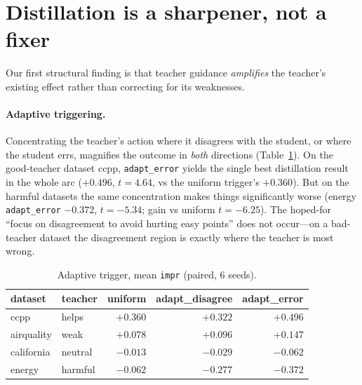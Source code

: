 \section{Distillation is a sharpener, not a fixer}
\label{sec:sharpener}

Our first structural finding is that teacher guidance \emph{amplifies} the teacher's
existing effect rather than correcting for its weaknesses.

\paragraph{Adaptive triggering.}
Concentrating the teacher's action where it disagrees with the student, or where the
student errs, magnifies the outcome in \emph{both} directions (Table~\ref{tab:adaptive}).
On the good-teacher dataset ccpp, \texttt{adapt\_error} yields the single best
distillation result in the whole arc ($+0.496$, $t=4.64$, vs the uniform trigger's
$+0.360$). But on the harmful datasets the same concentration makes things significantly
worse (energy \texttt{adapt\_error} $-0.372$, $t=-5.34$; gain vs uniform $t=-6.25$). The
hoped-for ``focus on disagreement to avoid hurting easy points'' does not occur---on a
bad-teacher dataset the disagreement region is exactly where the teacher is most wrong.

\begin{table}[t]
\centering
\footnotesize
\caption{Adaptive trigger, mean \texttt{impr} (paired, 6 seeds).}
\label{tab:adaptive}
\begin{tabular}{llrrr}
\toprule
dataset & teacher & uniform & adapt\_disagree & adapt\_error \\
\midrule
ccpp       & helps    & $+0.360$ & $+0.322$ & $\mathbf{+0.496}$ \\
airquality & weak     & $+0.078$ & $+0.096$ & $+0.147$ \\
california & neutral  & $-0.013$ & $-0.029$ & $-0.062$ \\
energy     & harmful  & $-0.062$ & $-0.277$ & $\mathbf{-0.372}$ \\
\bottomrule
\end{tabular}
\end{table}

